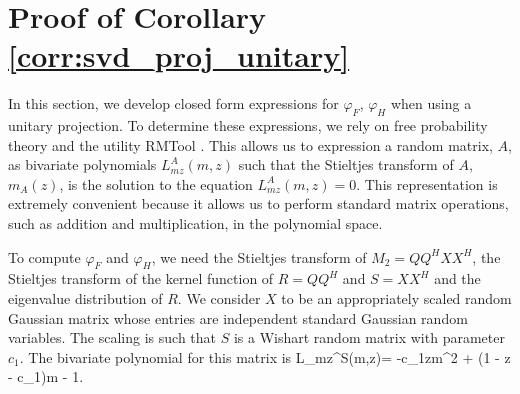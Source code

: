 \section{Proof of Corollary \ref{corr:svd_proj_unitary}}\label{sec:chpt7:corr_proof}

In this section, we develop closed form expressions for $\varphi_F$, $\varphi_H$ when using a
unitary projection. To determine these expressions, we rely on free probability theory and
the utility RMTool \cite{rao2008polynomial}. This allows us to expression a random matrix,
$A$, as bivariate polynomials $L_{mz}^{A}(m,z)$ such that the Stieltjes transform of $A$,
$m_A(z)$, is the solution to the equation $L_{mz}^A(m,z)=0$. This representation is
extremely convenient because it allows us to perform standard matrix operations, such as
addition and multiplication, in the polynomial space.

To compute $\varphi_F$ and $\varphi_H$, we need the Stieltjes transform of $M_2=QQ^HXX^H$,
the Stieltjes transform of the kernel function of $R=QQ^H$ and $S=XX^H$ and the eigenvalue
distribution of $R$. We consider $X$ to be an appropriately scaled random Gaussian matrix
whose entries are independent standard Gaussian random variables. The scaling is such that
$S$ is a Wishart random matrix with parameter $c_1$. The bivariate polynomial for
this matrix is
\be
L_{mz}^S(m,z)= -c_1zm^2 + (1 - z - c_1)m - 1. 
\ee

